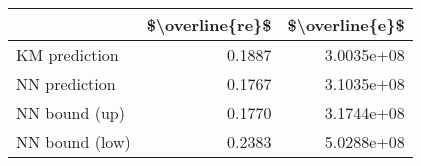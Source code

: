 \begin{tabular}{lrr}
\toprule
{} &  \$\textbackslash overline\{re\}\$ &  \$\textbackslash overline\{e\}\$ \\
\midrule
KM prediction  &           0.1887 &      3.0035e+08 \\
NN prediction  &           0.1767 &      3.1035e+08 \\
NN bound (up)  &           0.1770 &      3.1744e+08 \\
NN bound (low) &           0.2383 &      5.0288e+08 \\
\bottomrule
\end{tabular}
